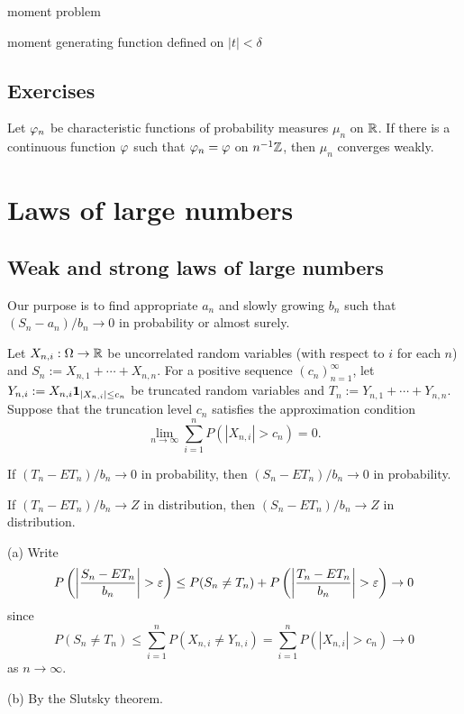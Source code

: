 \documentclass{../note}
\begin{document}
moment problem

moment generating function defined on $|t|<\delta$


\section*{Exercises}
\begin{prb}
Let $\varphi_n$ be characteristic functions of probability measures $\mu_n$ on $\mathbb{R}$.
If there is a continuous function $\varphi$ such that $\varphi_n=\varphi$ on $n^{-1}\mathbb{Z}$, then $\mu_n$ converges weakly.
\end{prb}


















\chapter{Laws of large numbers}

\section{Weak and strong laws of large numbers}

Our purpose is to find appropriate $a_n$ and slowly growing $b_n$ such that $(S_n-a_n)/b_n\to0$ in probability or almost surely.


\begin{prb}
Let $X_{n,i}:\Omega\to\mathbb{R}$ be uncorrelated random variables (with respect to $i$ for each $n$) and $S_n:=X_{n,1}+\cdots+X_{n,n}$.
For a positive sequence $(c_n)_{n=1}^\infty$, let $Y_{n,i}:=X_{n,i}\mathbf{1}_{|X_{n,i}|\le c_n}$ be truncated random variables and $T_n:=Y_{n,1}+\cdots+Y_{n,n}$.
Suppose that the truncation level $c_n$ satisfies the approximation condition
\[\lim_{n\to\infty}\sum_{i=1}^nP(|X_{n,i}|>c_n)=0.\]
\begin{parts}
\item If $(T_n-ET_n)/b_n\to0$ in probability, then $(S_n-ET_n)/b_n\to0$ in probability.
\item If $(T_n-ET_n)/b_n\to Z$ in distribution, then $(S_n-ET_n)/b_n\to Z$ in distribution.
\end{parts}
\end{prb}
\begin{pf}
(a)
Write
\[P\left(\left|\frac{S_n-ET_n}{b_n}\right|>\e\right)
\le P(S_n\ne T_n)+P\left(\left|\frac{T_n-ET_n}{b_n}\right|>\e\right)\to0\]
since
\[P(S_n\ne T_n)\le\sum_{i=1}^nP(X_{n,i}\ne Y_{n,i})=\sum_{i=1}^nP(|X_{n,i}|>c_n)\to0\]
as $n\to\infty$.

(b)
By the Slutsky theorem.
\end{pf}
\end{document}
